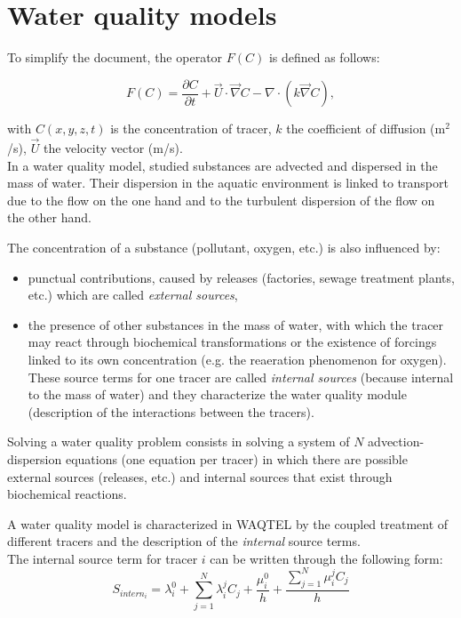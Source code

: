 \chapter{Water quality models}
\label{waq_models}
To simplify the document, the operator $F(C)$ is defined as follows:

\begin{equation}
  F(C) = \frac{\partial C}{\partial t} + \vec{U} \cdot \vec \nabla C
       - \nabla \cdot \left( k \vec \nabla C \right),
\end{equation}

with $C(x,y,z,t)$ is the concentration of tracer,
$k$ the coefficient of diffusion (m$^2$/s),
$\vec{U}$ the velocity vector (m/s).\\


In a water quality model, studied substances are advected and dispersed in the mass of water.
Their dispersion in the aquatic environment is linked to transport due to the flow on the one hand
and to the turbulent dispersion of the flow on the other hand.

The concentration of a substance (pollutant, oxygen, etc.) is also influenced by:
\begin{itemize}
\item punctual contributions, caused by releases (factories, sewage treatment plants, etc.)
  which are called \emph{external sources},
\item the presence of other substances in the mass of water, with which the tracer
  may react through biochemical transformations or the existence of forcings
  linked to its own concentration (e.g. the reaeration phenomenon for oxygen).
  These source terms for one tracer are called \emph{internal sources}
  (because internal to the mass of water) and they characterize the water quality module
  (description of the interactions between the tracers).
\end{itemize}

Solving a water quality problem consists in solving a system of $N$ advection-dispersion
equations (one equation per tracer) in which there are
possible external sources (releases, etc.)
and internal sources that exist through biochemical reactions.

A water quality model is characterized in WAQTEL by the coupled treatment of different tracers
and the description of the \emph{internal} source terms.\\

The internal source term for tracer $i$ can be written through the following form:
\begin{equation}
  S_{intern_i} = \lambda_i^0 + \sum_{j=1}^{N} \lambda_i^j C_j + \frac{\mu_i^0}{h}
               + \frac{\sum_{j=1}^{N}\mu_i^j C_j}{h}
\end{equation}

